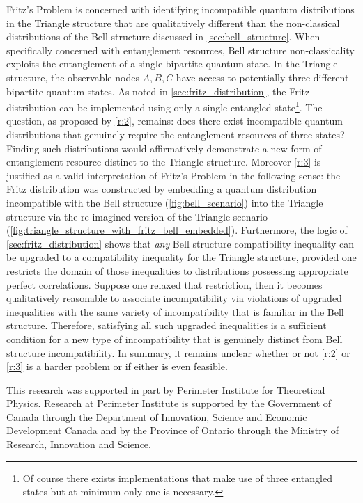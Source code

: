 \documentclass[aps, 10pt, english, twoside, pra, nofootinbib, tightenlines, longbibliography, superscriptaddress]{revtex4-1}
\begin{document}
    Fritz's Problem is concerned with identifying incompatible quantum distributions in the Triangle structure that are qualitatively different than the non-classical distributions of the Bell structure discussed in \cref{sec:bell_structure}. When specifically concerned with entanglement resources, Bell structure non-classicality exploits the entanglement of a single bipartite quantum state. In the Triangle structure, the observable nodes $A,B,C$ have access to potentially three different bipartite quantum states. As noted in \cref{sec:fritz_distribution}, the Fritz distribution can be implemented using only a single entangled state\footnote{Of course there exists implementations that make use of three entangled states but at minimum only one is necessary.}. The question, as proposed by \ref{r:2}, remains: does there exist incompatible quantum distributions that genuinely require the entanglement resources of three states? Finding such distributions would affirmatively demonstrate a new form of entanglement resource distinct to the Triangle structure. Moreover \ref{r:3} is justified as a valid interpretation of Fritz's Problem in the following sense: the Fritz distribution was constructed by embedding a quantum distribution incompatible with the Bell structure (\cref{fig:bell_scenario}) into the Triangle structure via the re-imagined version of the Triangle scenario (\cref{fig:triangle_structure_with_fritz_bell_embedded}). Furthermore, the logic of \cref{sec:fritz_distribution} shows that \textit{any} Bell structure compatibility inequality can be upgraded to a compatibility inequality for the Triangle structure, provided one restricts the domain of those inequalities to distributions possessing appropriate perfect correlations. Suppose one relaxed that restriction, then it becomes qualitatively reasonable to associate incompatibility via violations of upgraded inequalities with the same variety of incompatibility that is familiar in the Bell structure. Therefore, satisfying all such upgraded inequalities is a sufficient condition for a new type of incompatibility that is genuinely distinct from Bell structure incompatibility. In summary, it remains unclear whether or not \ref{r:2} or \ref{r:3} is a harder problem or if either is even feasible.


    \begin{acknowledgments}
    This research was supported in part by Perimeter Institute for Theoretical Physics. Research at Perimeter Institute is supported by the Government of Canada through the Department of Innovation, Science and Economic Development Canada and by the Province of Ontario through the Ministry of Research, Innovation and Science.
    \end{acknowledgments}
\end{document}
